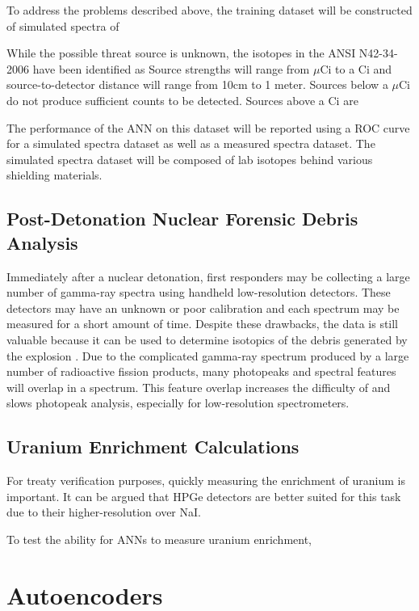 \documentclass[tocnosub,noragright,centerchapter,12pt,fullpage]{uiucecethesis09}
\begin{document}
To address the problems described above, the training dataset will be constructed of simulated spectra of 

While the possible threat source is unknown, the isotopes in the ANSI N42-34-2006 have been identified as 
Source strengths will range from $\mu$Ci to a Ci and source-to-detector distance will range from 10cm to 1 meter. Sources below a $\mu$Ci do not produce sufficient counts to be detected. Sources above a Ci are 

The performance of the ANN on this dataset will be reported using a ROC curve for a simulated spectra dataset as well as a measured spectra dataset. The simulated spectra dataset will be composed of lab isotopes behind various shielding materials. 


\subsection{Post-Detonation Nuclear Forensic Debris Analysis}

Immediately after a nuclear detonation, first responders may be collecting a large number of gamma-ray spectra using handheld low-resolution detectors. These detectors may have an unknown or poor calibration and each spectrum may be measured for a short amount of time. Despite these drawbacks, the data is still valuable because it can be used to determine isotopics of the debris generated by the explosion \cite{Moody}. Due to the complicated gamma-ray spectrum produced by a large number of radioactive fission products, many photopeaks and spectral features will overlap in a spectrum. This feature overlap increases the difficulty of and slows photopeak analysis, especially for low-resolution spectrometers. 

\subsection{Uranium Enrichment Calculations}

For treaty verification purposes, quickly measuring the enrichment of uranium is important. It can be argued that HPGe detectors are better suited for this task due to their higher-resolution over NaI. 

To test the ability for ANNs to measure uranium enrichment, 





\section{Autoencoders}
\end{document}
